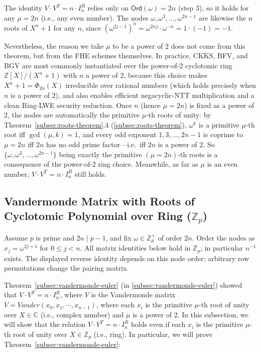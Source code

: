  The identity $V \cdot V^T = n \cdot I_n^R$ relies only on
$\textsf{Ord}(\omega) = 2n$ (step 3), so it holds for any $\mu = 2n$ (i.e., any even number).
The nodes $\omega, \omega^3, \ldots, \omega^{2n-1}$ are likewise the $n$ roots of $X^n + 1$
for any $n$, since $(\omega^{2j-1})^n = \omega^{2nj}\cdot\omega^{-n} = 1\cdot(-1) = -1$.

Nevertheless, the reason we take $\mu$ to be a power of 2 does not come from this theorem, but
from the FHE schemes themselves. In practice, CKKS, BFV, and BGV are most commonly instantiated
over the power-of-2 cyclotomic ring $\mathbb{Z}[X]/(X^n + 1)$ with $n$ a power of 2, because this choice makes $X^n + 1 = \Phi_{2n}(X)$ irreducible over rational numbers (which holds
precisely when $n$ is a power of 2), and also enables efficient negacyclic-NTT multiplication
and a clean Ring-LWE security reduction. Once
$n$ (hence $\mu = 2n$) is fixed as a power of 2, the nodes are automatically the primitive
$\mu$-th roots of unity: by Theorem~\ref*{subsec:roots-theorem}.4 (\autoref{subsec:roots-theorem}),
$\omega^k$ is a primitive $\mu$-th root iff $\gcd(\mu, k) = 1$, and every odd exponent
$1, 3, \ldots, 2n-1$ is coprime to $\mu = 2n$ iff $2n$ has no odd prime factor---i.e.\ iff $2n$
is a power of 2. So $\{\omega, \omega^3, \ldots, \omega^{2n-1}\}$ being exactly the primitive
$(\mu=2n)$-th roots is a consequence of the power-of-2 ring choice. Meanwhile, as far as $\mu$ is an even number, $V \cdot V^T = n \cdot I_n^R$ still holds.



\subsection{Vandermonde Matrix with Roots of Cyclotomic Polynomial over Ring ($\mathbb{Z}_p$)}
\label{subsec:vandermonde-euler-integer-ring}

Assume $p$ is prime and $2n\mid p-1$, and fix $\omega\in\mathbb Z_p^\times$ of order $2n$. Order the nodes as $x_j=\omega^{2j+1}$ for $0\le j<n$. All matrix identities below hold in $\mathbb Z_p$; in particular $n^{-1}$ exists. The displayed reverse identity depends on this node order; arbitrary row permutations change the pairing matrix.

Theorem~\ref*{subsec:vandermonde-euler} (in \autoref{subsec:vandermonde-euler}) showed that $V \cdot V^T = n \cdot I^R_n$, where $V$ is the Vandermonde matrix $V = \mathit{Vander}(x_0, x_1, \cdots, x_{n-1})$, where each $x_i$ is the primitive $\mu$-th root of unity over $X \in \mathbb{C}$ (i.e., complex number) and $\mu$ is a power of 2. In this subsection, we will show that the relation $V \cdot V^T = n \cdot I^R_n$ holds even if each $x_i$ is the primitive $\mu$-th root of unity over $X \in \mathbb{Z}_p$ (i.e., ring). In particular, we will prove Theorem~\ref*{subsec:vandermonde-euler}: 


